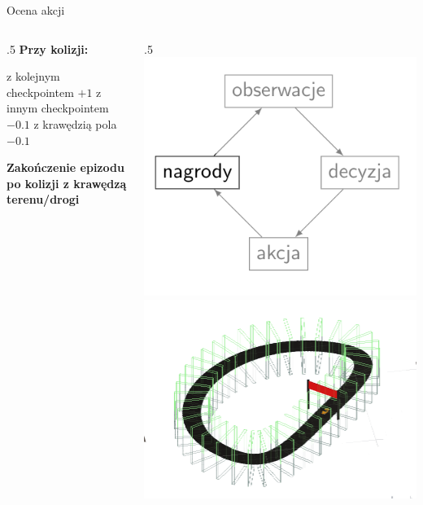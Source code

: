 \begin{frame}{Ocena akcji}
	
	\begin{columns}
		\begin{column}{.5\hsize}
			\textbf{Przy kolizji:}
			\begin{itemize}
				\myitem z kolejnym checkpointem $+1$
				\myitem z innym checkpointem $-0.1$
				\myitem z krawędzią pola $-0.1$
			\end{itemize}
			\vspace{1cm}
			\textbf{Zakończenie epizodu po kolizji z krawędzą terenu/drogi}
			\vspace{3cm}
		\end{column}
		
		\begin{column}{.5\hsize}
			{\hspace*{.6\linewidth}\includegraphics[width=.4\linewidth]{figures/learning_loop_4.png}}
			\vspace{7cm}
			\includegraphics[width=\linewidth]{figures/checkpoints.png}
		\end{column}
	\end{columns}
	
\end{frame}
